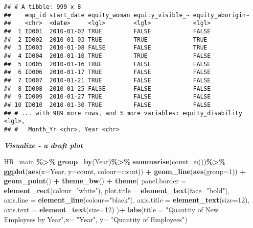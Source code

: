 \documentclass[
]{article}
\newenvironment{Shaded}{\begin{snugshade}}{\end{snugshade}}
\newcommand{\DataTypeTok}[1]{\textcolor[rgb]{0.13,0.29,0.53}{#1}}
\newcommand{\DecValTok}[1]{\textcolor[rgb]{0.00,0.00,0.81}{#1}}
\newcommand{\KeywordTok}[1]{\textcolor[rgb]{0.13,0.29,0.53}{\textbf{#1}}}
\newcommand{\NormalTok}[1]{#1}
\newcommand{\OperatorTok}[1]{\textcolor[rgb]{0.81,0.36,0.00}{\textbf{#1}}}
\newcommand{\StringTok}[1]{\textcolor[rgb]{0.31,0.60,0.02}{#1}}
\begin{document}
\begin{verbatim}
## # A tibble: 999 x 8
##    emp_id start_date equity_woman equity_visible_~ equity_aborigin~
##    <chr>  <date>     <lgl>        <lgl>            <lgl>           
##  1 ID001  2010-01-02 TRUE         FALSE            FALSE           
##  2 ID002  2010-01-03 TRUE         TRUE             TRUE            
##  3 ID003  2010-01-08 FALSE        FALSE            TRUE            
##  4 ID004  2010-01-10 TRUE         TRUE             FALSE           
##  5 ID005  2010-01-16 TRUE         FALSE            FALSE           
##  6 ID006  2010-01-17 TRUE         FALSE            FALSE           
##  7 ID007  2010-01-21 TRUE         FALSE            FALSE           
##  8 ID008  2010-01-25 FALSE        FALSE            FALSE           
##  9 ID009  2010-01-27 TRUE         FALSE            FALSE           
## 10 ID010  2010-01-30 TRUE         FALSE            FALSE           
## # ... with 989 more rows, and 3 more variables: equity_disability <lgl>,
## #   Month_Yr <chr>, Year <chr>
\end{verbatim}

\textbf{\emph{Visualize - a draft plot}}

\begin{Shaded}
\begin{Highlighting}[]
\NormalTok{HR\_main }\OperatorTok{\%\textgreater{}\%}
\StringTok{   }\KeywordTok{group\_by}\NormalTok{(}\StringTok{\textasciigrave{}}\DataTypeTok{Year}\StringTok{\textasciigrave{}}\NormalTok{)}\OperatorTok{\%\textgreater{}\%}
\StringTok{   }\KeywordTok{summarise}\NormalTok{(}\DataTypeTok{count=}\KeywordTok{n}\NormalTok{())}\OperatorTok{\%\textgreater{}\%}
\StringTok{   }\KeywordTok{ggplot}\NormalTok{(}\KeywordTok{aes}\NormalTok{(}\DataTypeTok{x=}\NormalTok{Year, }\DataTypeTok{y=}\NormalTok{count, }\DataTypeTok{colour=}\NormalTok{count)) }\OperatorTok{+}\StringTok{ }
\StringTok{   }\KeywordTok{geom\_line}\NormalTok{(}\KeywordTok{aes}\NormalTok{(}\DataTypeTok{group=}\DecValTok{1}\NormalTok{)) }\OperatorTok{+}\StringTok{ }\KeywordTok{geom\_point}\NormalTok{() }\OperatorTok{+}\StringTok{ }\KeywordTok{theme\_bw}\NormalTok{() }\OperatorTok{+}
\StringTok{   }\KeywordTok{theme}\NormalTok{(}
    \DataTypeTok{panel.border =} \KeywordTok{element\_rect}\NormalTok{(}\DataTypeTok{colour=}\StringTok{"white"}\NormalTok{),}
    \DataTypeTok{plot.title =} \KeywordTok{element\_text}\NormalTok{(}\DataTypeTok{face=}\StringTok{"bold"}\NormalTok{),}
    \DataTypeTok{axis.line =} \KeywordTok{element\_line}\NormalTok{(}\DataTypeTok{colour=}\StringTok{"black"}\NormalTok{),}
    \DataTypeTok{axis.title =} \KeywordTok{element\_text}\NormalTok{(}\DataTypeTok{size=}\DecValTok{12}\NormalTok{),}
    \DataTypeTok{axis.text =} \KeywordTok{element\_text}\NormalTok{(}\DataTypeTok{size=}\DecValTok{12}\NormalTok{)}
\NormalTok{   )}\OperatorTok{+}
\StringTok{  }\KeywordTok{labs}\NormalTok{(}\DataTypeTok{title =} \StringTok{"Quantity of New Employees by Year"}\NormalTok{,}\DataTypeTok{x=} \StringTok{"Year"}\NormalTok{, }\DataTypeTok{y=} \StringTok{"Quantity of Employees"}\NormalTok{)}
\end{Highlighting}
\end{Shaded}
\end{document}
